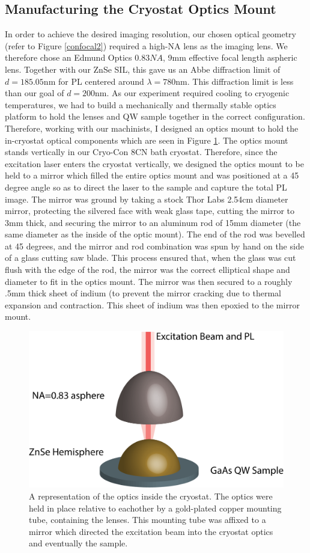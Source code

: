 \subsection{Manufacturing the Cryostat Optics Mount}
\indent In order to achieve the desired imaging resolution, our chosen optical geometry (refer to Figure \ref{confocal2}) required a high-NA lens as the imaging lens. We therefore chose an Edmund Optics $0.83NA$, 9mm effective focal length aspheric lens. Together with our ZnSe SIL, this gave us an Abbe diffraction limit of $d = 185.05$nm for PL centered around $\lambda = 780$nm. This diffraction limit is less than our goal of $d = 200$nm. As our experiment required cooling to cryogenic temperatures, we had to build a mechanically and thermally stable optics platform to hold the lenses and QW sample together in the correct configuration. Therefore, working with our machinists, I designed an optics mount to hold the in-cryostat optical components which are seen in Figure \ref{mount}. The optics mount stands vertically in our Cryo-Con 8CN bath cryostat. Therefore, since the excitation laser enters the cryostat vertically, we designed the optics mount to be held to a mirror which filled the entire optics mount and was positioned at a 45 degree angle so as to direct the laser to the sample and capture the total PL image. The mirror was ground by taking a stock Thor Labs 2.54cm diameter mirror, protecting the silvered face with weak glass tape, cutting the mirror to 3mm thick, and securing the mirror to an aluminum rod of 15mm diameter (the same diameter as the inside of the optic mount). The end of the rod was bevelled at 45 degrees, and the mirror and rod combination was spun by hand on the side of a glass cutting saw blade. This process ensured that, when the glass was cut flush with the edge of the rod, the mirror was the correct elliptical shape and diameter to fit in the optics mount. The mirror was then secured to a roughly .5mm thick sheet of indium (to prevent the mirror cracking due to thermal expansion and contraction. This sheet of indium was then epoxied to the mirror mount. 
\begin{figure}[h!]
\centering
\includegraphics[width = .6\textwidth]{Cryopt.png}
\caption{ \doublespacing A representation of the optics inside the cryostat. The optics were held in place relative to eachother by a gold-plated copper mounting tube, containing the lenses. This mounting tube was affixed to a mirror which directed the excitation beam into the cryostat optics and eventually the sample.}
\label{mount}
\end{figure}
